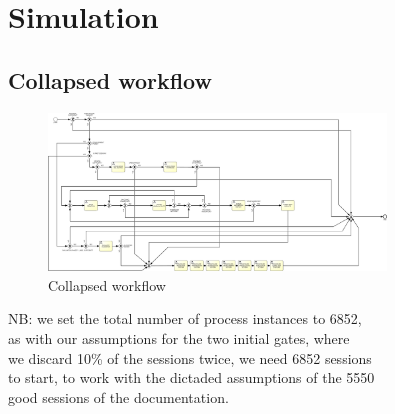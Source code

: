 \section{Simulation}

\subsection{Collapsed workflow}

\begin{figure}[H]
\centering
\includegraphics[width=0.8\textwidth]{figures/Collapsed Workflow SIM.pdf}
\caption{Collapsed workflow}
\label{fig:collapsed_workflow}
\end{figure}


NB: we set the total number of process instances to 6852,\\
as with our assumptions for the two initial gates, where\\
we discard 10\% of the sessions twice, we need 6852 sessions\\
to start, to work with the dictaded assumptions of the 5550\\
good sessions of the documentation.\\


